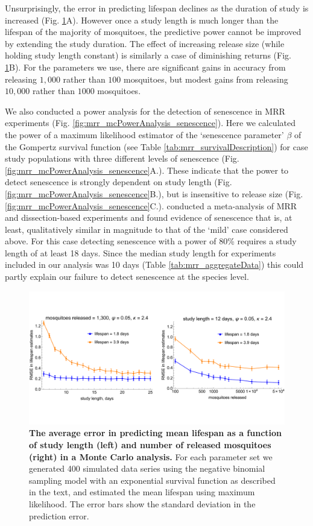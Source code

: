 \documentclass[12pt]{article}
\begin{document}
Unsurprisingly, the error in predicting lifespan declines as the duration of study is increased (Fig. \ref{fig:mrr_mcPowerAnalysis}A). However once a study length is much longer than the lifespan of the majority of mosquitoes, the predictive power cannot be improved by extending the study duration. The effect of increasing release size (while holding study length constant) is similarly a case of diminishing returns (Fig. \ref{fig:mrr_mcPowerAnalysis}B). For the parameters we use, there are significant gains in accuracy from releasing $1,000$ rather than $100$ mosquitoes, but modest gains from releasing $10,000$ rather than $1000$ mosquitoes.

We also conducted a power analysis for the detection of senescence in MRR experiments (Fig. \ref{fig:mrr_mcPowerAnalysis_senescence}). Here we calculated the power of a maximum likelihood estimator of the `senescence parameter' $\beta$ of the Gompertz survival function (see Table \ref{tab:mrr_survivalDescription}) for case study populations with three different levels of senescence (Fig. \ref{fig:mrr_mcPowerAnalysis_senescence}A.). These indicate that the power to detect senescence is strongly dependent on study length (Fig. \ref{fig:mrr_mcPowerAnalysis_senescence}B.), but is insensitive to release size (Fig. \ref{fig:mrr_mcPowerAnalysis_senescence}C.). \cite{clements1981analysis} conducted a meta-analysis of MRR and dissection-based experiments and found evidence of senescence that is, at least, qualitatively similar in magnitude to that of the `mild' case considered above. For this case detecting senescence with a power of 80\% requires a study length of at least 18 days. Since the median study length for experiments included in our analysis was 10 days (Table \ref{tab:mrr_aggregateData}) this could partly explain our failure to detect senescence at the species level.

\begin{figure}[ht]
	\centerline{\includegraphics[width=1.25\textwidth]{./Figure_files/mrr_mcPowerAnalysis.pdf}}
	\caption{\textbf{The average error in predicting mean lifespan as a function of study length (left) and number of released mosquitoes (right) in a Monte Carlo analysis.} For each parameter set we generated 400 simulated data series using the negative binomial sampling model with an exponential survival function as described in the text, and estimated the mean lifespan using maximum likelihood. The error bars show the standard deviation in the prediction error.}
	\label{fig:mrr_mcPowerAnalysis}
\end{figure}
\end{document}
